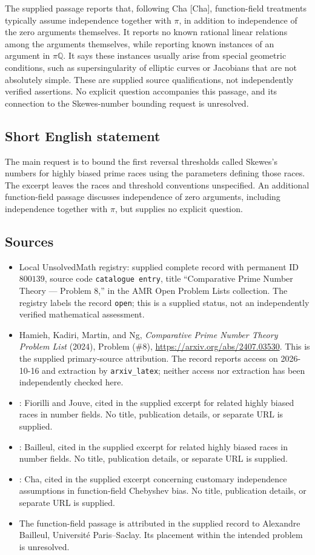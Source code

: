\documentclass[11pt]{article}
\newcommand{\Q}{\mathbb{Q}}
\begin{document}
The supplied passage reports that, following Cha [Cha], function-field treatments typically assume independence together with \(\pi\), in addition to independence of the zero arguments themselves. It reports no known rational linear relations among the arguments themselves, while reporting known instances of an argument in \(\pi\Q\). It says these instances usually arise from special geometric conditions, such as supersingularity of elliptic curves or Jacobians that are not absolutely simple. These are supplied source qualifications, not independently verified assertions. No explicit question accompanies this passage, and its connection to the Skewes-number bounding request is unresolved.
\subsection{Short English statement}
The main request is to bound the first reversal thresholds called Skewes's numbers for highly biased prime races using the parameters defining those races. The excerpt leaves the races and threshold conventions unspecified. An additional function-field passage discusses independence of zero arguments, including independence together with \(\pi\), but supplies no explicit question.
\subsection{Sources}
\begin{itemize}
\item Local UnsolvedMath registry: supplied complete record with permanent ID \(800139\), source code \texttt{catalogue entry}, title ``Comparative Prime Number Theory --- Problem 8,'' in the AMR Open Problem Lists collection. The registry labels the record \texttt{open}; this is a supplied status, not an independently verified mathematical assessment.
\item Hamieh, Kadiri, Martin, and Ng, \emph{Comparative Prime Number Theory Problem List} (2024), Problem (\#8), \url{https://arxiv.org/abs/2407.03530}. This is the supplied primary-source attribution. The record reports access on 2026-10-16 and extraction by \texttt{arxiv\_latex}; neither access nor extraction has been independently checked here.
\item [FJ]: Fiorilli and Jouve, cited in the supplied excerpt for related highly biased races in number fields. No title, publication details, or separate URL is supplied.
\item [Bai]: Bailleul, cited in the supplied excerpt for related highly biased races in number fields. No title, publication details, or separate URL is supplied.
\item [Cha]: Cha, cited in the supplied excerpt concerning customary independence assumptions in function-field Chebyshev bias. No title, publication details, or separate URL is supplied.
\item The function-field passage is attributed in the supplied record to Alexandre Bailleul, Universit\'e Paris--Saclay. Its placement within the intended problem is unresolved.
\end{itemize}
\end{document}
